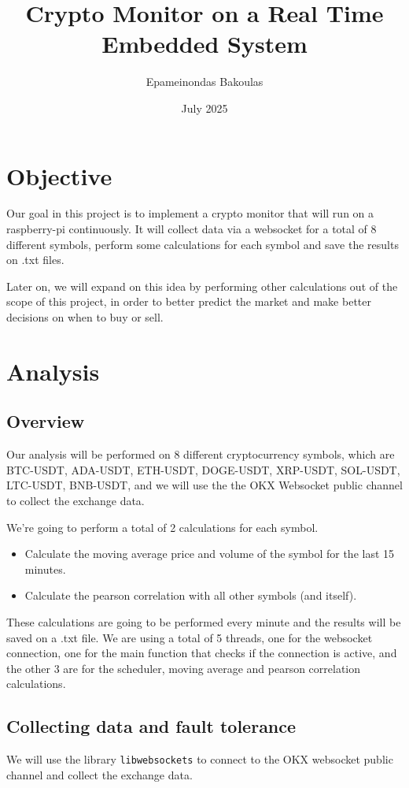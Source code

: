 \documentclass{article}
\title{Crypto Monitor on a Real Time Embedded System}
\author{Epameinondas Bakoulas}
\date{July 2025}
\begin{document}
\maketitle

\section{Objective}
Our goal in this project is to implement a crypto monitor that will run on a raspberry-pi continuously.
It will collect data via a websocket for a total of 8 different symbols, perform some calculations for
each symbol and save the results on .txt files.

Later on, we will expand on this idea by performing other calculations out of the scope of this project,
in order to better predict the market and make better decisions on when to buy or sell.

\section{Analysis}

\subsection{Overview}
Our analysis will be performed on 8 different cryptocurrency symbols, which are
BTC-USDT, ADA-USDT, ETH-USDT, DOGE-USDT, XRP-USDT, SOL-USDT, LTC-USDT, BNB-USDT, and 
we will use the the OKX Websocket public channel to collect the exchange data.

We're going to perform a total of 2 calculations for each symbol.
\begin{itemize}
    \item Calculate the moving average price and volume of the symbol for the last 15 minutes.
    \item Calculate the pearson correlation with all other symbols (and itself).
\end{itemize}

These calculations are going to be performed every minute and the results will be saved on a .txt file.
We are using a total of 5 threads, one for the websocket connection, one for the main function that checks if the connection
is active, and the other 3 are for the scheduler, moving average and pearson correlation calculations.

\subsection{Collecting data and fault tolerance}
We will use the library \texttt{libwebsockets} to connect to the OKX websocket public channel and collect the exchange data.
\end{document}
